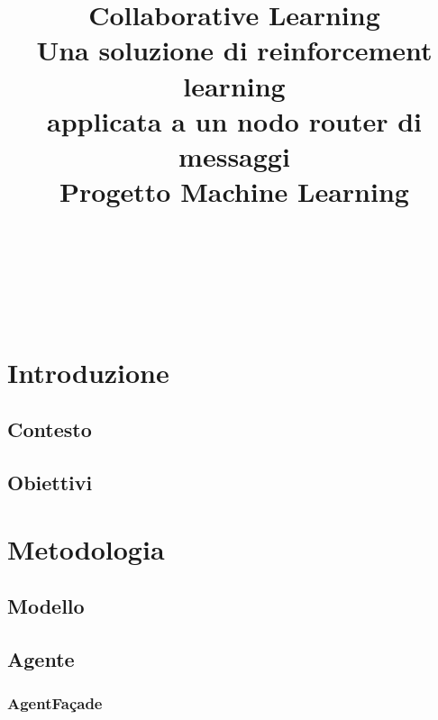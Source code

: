 \documentclass[conference]{IEEEtran}
\begin{document}
\title{Collaborative Learning\\ \large Una soluzione di reinforcement learning\\ applicata a un nodo router di messaggi\\
{\footnotesize Progetto Machine Learning}
}
\author{
 \\
\and
{}
 \\
\and
{}
 \\
}

\newcommand{\code}[1]{\texttt{#1}}

\maketitle

\begin{abstract}
\end{abstract}

\section{Introduzione}

\subsection{Contesto}

\subsection{Obiettivi}

\section{Metodologia}

\subsection{Modello}

\subsection{Agente}

\subsubsection{AgentFaçade}
\end{document}
